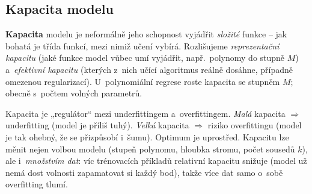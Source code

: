 \subsection{Kapacita modelu}

\begin{definice}
\textbf{Kapacita} modelu je neformálně jeho schopnost vyjádřit \emph{složité} funkce -- jak bohatá je třída funkcí, mezi nimiž učení vybírá. Rozlišujeme \emph{reprezentační kapacitu} (jaké funkce model vůbec umí vyjádřit, např.\ polynomy do stupně $M$) a~\emph{efektivní kapacitu} (kterých z~nich učící algoritmus reálně dosáhne, případně omezenou regularizací). U~polynomiální regrese roste kapacita se stupněm $M$; obecně s~počtem volných parametrů.
\end{definice}

\begin{intuice}
Kapacita je „regulátor`` mezi underfittingem a~overfittingem. \emph{Malá} kapacita $\Rightarrow$ underfitting (model je příliš tuhý). \emph{Velká} kapacita $\Rightarrow$ riziko overfittingu (model je tak ohebný, že se přizpůsobí i~šumu). Optimum je uprostřed. Kapacitu lze měnit nejen volbou modelu (stupeň polynomu, hloubka stromu, počet sousedů $k$), ale i~\emph{množstvím dat}: víc trénovacích příkladů relativní kapacitu snižuje (model už nemá dost volnosti zapamatovat si každý bod), takže více dat samo o~sobě overfitting tlumí.
\end{intuice}

